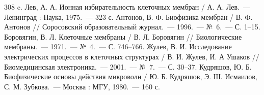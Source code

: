 \begin{thebibliography}{99}
    308 c.
 Лев, А. А. Ионная избирательность клеточных мембран /
    А. А. Лев.~--- Ленинград : Наука, 1975.~--- 323 с.
 Антонов, В. Ф. Биофизика мембран / В. Ф. Антонов // Соросовский
    образовательный журнал.~--- 1996.~--- №~6.~--- С. 1--15.
 Боровягин, В. Л. Клеточные мембраны / В. Л. Боровягин //
    Биологические мембраны.~--- 1971.~--- №~4.~--- С. 746--766.
 Жулев, В. И. Исследование электрических процессов в клеточных
    структурах / В. И. Жулев, И. А Ушаков // Биомедицинская электроника.~---
    2001.~--- №~7.~--- С. 30--37.
 Кудряшов, Ю. Б. Биофизические основы действия микроволн /
    Ю. Б. Кудряшов, Э. Ш. Исмаилов, С. М. Зубкова.~--- Москва : МГУ, 1980.~---
    160 с.
\end{thebibliography}
